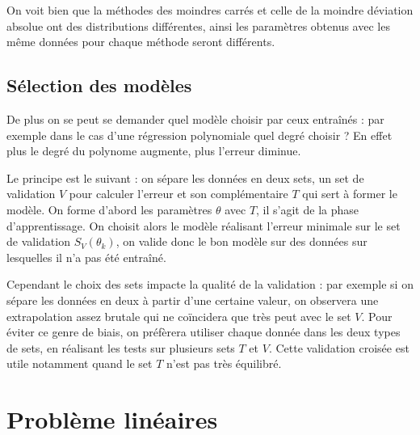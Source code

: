 

		On voit bien que la méthodes des moindres carrés et celle de la moindre déviation absolue ont des distributions différentes, ainsi les paramètres obtenus avec les même données pour chaque méthode seront différents.








	\subsection{Sélection des modèles}
	    De plus on se peut se demander quel modèle choisir par ceux entraînés : par exemple dans le cas d'une régression polynomiale quel degré choisir ? En effet plus le degré du polynome augmente, plus l'erreur diminue.

	    Le principe est le suivant : on sépare les données en deux sets, un set de validation $V$ pour calculer l'erreur et son complémentaire $T$ qui sert à former le modèle.
	    On forme d'abord les paramètres $\theta$ avec $T$, il s'agit de la phase d'apprentissage.
	    On choisit alors le modèle réalisant l'erreur minimale sur le set de validation $S_V(\theta_k)$, on valide donc le bon modèle sur des données sur lesquelles il n'a pas été entraîné.

	    Cependant le choix des sets impacte la qualité de la validation : par exemple si on sépare les données en deux à partir d'une certaine valeur, on observera une extrapolation assez brutale qui ne coïncidera que très peut avec le set $V$.
	    Pour éviter ce genre de biais, on préfèrera utiliser chaque donnée dans les deux types de sets, en réalisant les tests sur plusieurs sets $T$ et $V$. Cette validation croisée est utile notamment quand le set $T$ n'est pas très équilibré.

\section{Problème linéaires}

